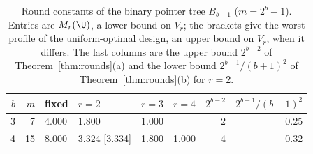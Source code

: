 \begin{table}[h]
\centering
\caption{Round constants of the binary pointer tree $B_{b-1}$ ($m=2^b-1$). Entries are $M_r(\U)$, a lower bound on $V_r$; the brackets give the worst profile of the uniform-optimal design, an upper bound on $V_r$, when it differs. The last columns are the upper bound $2^{b-2}$ of Theorem~\ref{thm:rounds}(a) and the lower bound $2^{b-1}/(b+1)^2$ of Theorem~\ref{thm:rounds}(b) for $r=2$.}
\label{tab:pointer}
\small
\begin{tabular}{rrllllrr}
\toprule
$b$ & $m$ & fixed & $r=2$ & $r=3$ & $r=4$ & $2^{b-2}$ & $2^{b-1}/(b+1)^2$ \\
\midrule
3 & 7 & 4.000 & 1.800 & 1.000 &  & 2 & 0.25 \\
4 & 15 & 8.000 & 3.324 [3.334] & 1.800 & 1.000 & 4 & 0.32 \\
\bottomrule
\end{tabular}
\end{table}
